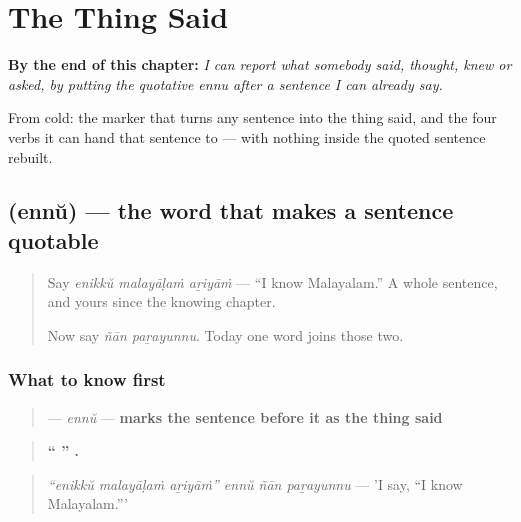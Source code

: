 
\chapter{The Thing Said}
\label{ch:ml-ennu}

\begin{chapteropening}
\textbf{By the end of this chapter:} \emph{I can report what somebody said, thought, knew or asked, by putting the quotative ennu after a sentence I can already say.}

From cold: the marker that turns any sentence into the thing said, and the four verbs it can hand that sentence to — with nothing inside the quoted sentence rebuilt.
\end{chapteropening}

\section[\texorpdfstring{\ml{എന്ന്} (ennŭ)}{എന്ന് (ennŭ)}]{ (ennŭ) — the word that makes a sentence quotable}

\label{lesson:ML-C72-ennu}



\begin{quote}
Say \emph{enikkŭ malayāḷaṁ aṟiyāṁ} — \textquotedblleft{}I know Malayalam.\textquotedblright{} A whole sentence, and yours since the knowing chapter.

Now say \emph{ñān paṟayunnu}. Today one word joins those two.
\end{quote}

\subsection*{What to know first}
\begin{quote}
\textbf{} — \emph{ennŭ} — \textbf{marks the sentence before it as the thing said}
\end{quote}

\begin{quote}
\textbf{\textquotedblleft{}  \textquotedblright{}   .}
\end{quote}

\begin{quote}
\emph{\textquotedblleft{}enikkŭ malayāḷaṁ aṟiyāṁ\textquotedblright{} ennŭ ñān paṟayunnu} — 'I say, \textquotedblleft{}I know Malayalam.\textquotedblright{}'
\end{quote}

